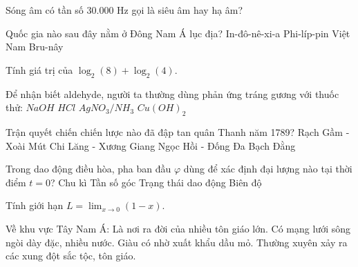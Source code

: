\begin{ex}
    Sóng âm có tần số 30.000 Hz gọi là siêu âm hay hạ âm?
\end{ex}

\begin{ex}
    Quốc gia nào sau đây nằm ở Đông Nam Á lục địa?
    \choice
    {In-đô-nê-xi-a}
    {Phi-líp-pin}
    {\True Việt Nam}
    {Bru-nây}
\end{ex}

\begin{ex}
    Tính giá trị của $\log_2(8) + \log_2(4)$.
\end{ex}

\begin{ex}
    Để nhận biết aldehyde, người ta thường dùng phản ứng tráng gương với thuốc thử:
    \choice
    {$NaOH$}
    {$HCl$}
    {\True $AgNO_3/NH_3$}
    {$Cu(OH)_2$}
\end{ex}

\begin{ex}
    Trận quyết chiến chiến lược nào đã đập tan quân Thanh năm 1789?
    \choice
    {Rạch Gầm - Xoài Mút}
    {Chi Lăng - Xương Giang}
    {\True Ngọc Hồi - Đống Đa}
    {Bạch Đằng}
\end{ex}

\begin{ex}
    Trong dao động điều hòa, pha ban đầu $\varphi$ dùng để xác định đại lượng nào tại thời điểm $t=0$?
    \choice
    {Chu kì}
    {Tần số góc}
    {\True Trạng thái dao động}
    {Biên độ}
\end{ex}

\begin{ex}
    Tính giới hạn $L = \lim_{x \to 0} (1 - x)$.
\end{ex}

\begin{ex}
    Về khu vực Tây Nam Á:
    \choiceTF
    {\True Là nơi ra đời của nhiều tôn giáo lớn.}
    {Có mạng lưới sông ngòi dày đặc, nhiều nước.}
    {\True Giàu có nhờ xuất khẩu dầu mỏ.}
    {\True Thường xuyên xảy ra các xung đột sắc tộc, tôn giáo.}
\end{ex}

